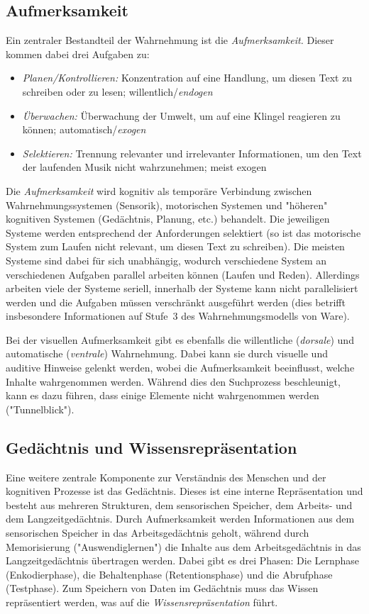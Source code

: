 \subsection{Aufmerksamkeit}
	Ein zentraler Bestandteil der Wahrnehmung ist die \emph{Aufmerksamkeit.} Dieser kommen dabei drei Aufgaben zu:
	\begin{itemize}
		\item \emph{Planen/Kontrollieren:} Konzentration auf eine Handlung, \zB um diesen Text zu schreiben oder zu lesen; willentlich/\emph{endogen}
		\item \emph{Überwachen:} Überwachung der Umwelt, \zB um auf eine Klingel reagieren zu können; automatisch/\emph{exogen}
		\item \emph{Selektieren:} Trennung relevanter und irrelevanter Informationen, \zB um den Text der laufenden Musik nicht wahrzunehmen; meist exogen
	\end{itemize}
	Die \emph{Aufmerksamkeit} wird kognitiv als temporäre Verbindung zwischen Wahrnehmungssystemen (Sensorik), motorischen Systemen und "höheren" kognitiven Systemen (Gedächtnis, Planung, etc.) behandelt. Die jeweiligen Systeme werden entsprechend der Anforderungen selektiert (so ist das motorische System zum Laufen \bspw nicht relevant, um diesen Text zu schreiben). Die meisten Systeme sind dabei für sich unabhängig, wodurch verschiedene System an verschiedenen Aufgaben parallel arbeiten können (\zB Laufen und Reden). Allerdings arbeiten viele der Systeme seriell, \dh innerhalb der Systeme kann nicht parallelisiert werden und die Aufgaben müssen verschränkt ausgeführt werden (dies betrifft insbesondere Informationen auf Stufe~3 des Wahrnehmungsmodells von Ware).

	Bei der visuellen Aufmerksamkeit gibt es ebenfalls die willentliche (\emph{dorsale}) und automatische (\emph{ventrale}) Wahrnehmung. Dabei kann sie durch visuelle und auditive Hinweise gelenkt werden, wobei die Aufmerksamkeit beeinflusst, welche Inhalte wahrgenommen werden. Während dies den Suchprozess beschleunigt, kann es dazu führen, dass einige Elemente nicht wahrgenommen werden ("Tunnelblick").

\subsection{Gedächtnis und Wissensrepräsentation}
	Eine weitere zentrale Komponente zur Verständnis des Menschen und der kognitiven Prozesse ist das Gedächtnis. Dieses ist eine interne Repräsentation und besteht aus mehreren Strukturen, dem sensorischen Speicher, dem Arbeits- und dem Langzeitgedächtnis. Durch Aufmerksamkeit werden Informationen aus dem sensorischen Speicher in das Arbeitsgedächtnis geholt, während durch Memorisierung ("Auswendiglernen") die Inhalte aus dem Arbeitsgedächtnis in das Langzeitgedächtnis übertragen werden. Dabei gibt es drei Phasen: Die Lernphase (Enkodierphase), die Behaltenphase (Retentionsphase) und die Abrufphase (Testphase). Zum Speichern von Daten im Gedächtnis muss das Wissen repräsentiert werden, was auf die \emph{Wissensrepräsentation} führt.

